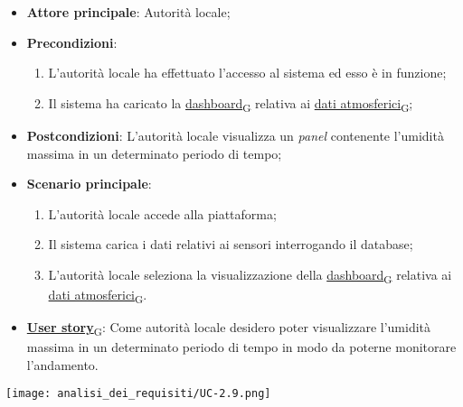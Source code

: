 \begin{itemize}
	\item \textbf{Attore principale}: Autorità locale;
	\item \textbf{Precondizioni}:
	      \begin{enumerate}
		      \item L'autorità locale ha effettuato l'accesso al sistema ed esso è in funzione;
		      \item Il sistema ha caricato la \href{https://7last.github.io/docs/rtb/documentazione-interna/glossario\#dashboard}{dashboard\textsubscript{G}} relativa ai \href{https://7last.github.io/docs/rtb/documentazione-interna/glossario\#dati-atmosferici}{dati atmosferici\textsubscript{G}};
	      \end{enumerate}
	\item \textbf{Postcondizioni}: L'autorità locale visualizza un \textit{panel} contenente l'umidità massima in un determinato periodo di tempo;
	\item \textbf{Scenario principale}:
	      \begin{enumerate}
		      \item L'autorità locale accede alla piattaforma;
		      \item Il sistema carica i dati relativi ai sensori interrogando il database;
		      \item L'autorità locale seleziona la visualizzazione della \href{https://7last.github.io/docs/rtb/documentazione-interna/glossario\#dashboard}{dashboard\textsubscript{G}} relativa ai \href{https://7last.github.io/docs/rtb/documentazione-interna/glossario\#dati-atmosferici}{dati atmosferici\textsubscript{G}}.
	      \end{enumerate}
	\item \href{https://7last.github.io/docs/rtb/documentazione-interna/glossario\#user-story}{\textbf{User story}\textsubscript{G}}: Come autorità locale desidero poter visualizzare l'umidità massima in un determinato periodo di tempo
	      in modo da poterne monitorare l'andamento.
\end{itemize}

\begin{center}
	\texttt{[image: analisi\_dei\_requisiti/UC-2.9.png]}
\end{center}

